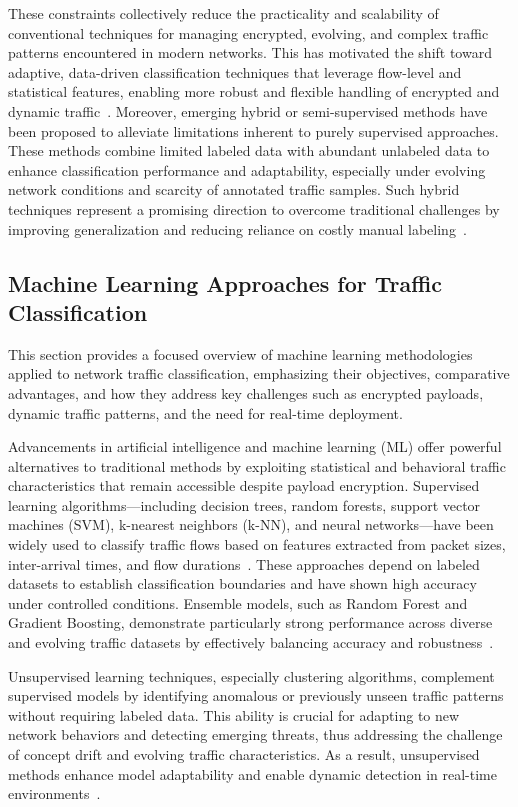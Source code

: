 \documentclass[sigconf]{acmart}
\begin{document}
These constraints collectively reduce the practicality and scalability of conventional techniques for managing encrypted, evolving, and complex traffic patterns encountered in modern networks. This has motivated the shift toward adaptive, data-driven classification techniques that leverage flow-level and statistical features, enabling more robust and flexible handling of encrypted and dynamic traffic~\cite{ref51}. Moreover, emerging hybrid or semi-supervised methods have been proposed to alleviate limitations inherent to purely supervised approaches. These methods combine limited labeled data with abundant unlabeled data to enhance classification performance and adaptability, especially under evolving network conditions and scarcity of annotated traffic samples. Such hybrid techniques represent a promising direction to overcome traditional challenges by improving generalization and reducing reliance on costly manual labeling~\cite{ref51}.

\subsection{Machine Learning Approaches for Traffic Classification}

This section provides a focused overview of machine learning methodologies applied to network traffic classification, emphasizing their objectives, comparative advantages, and how they address key challenges such as encrypted payloads, dynamic traffic patterns, and the need for real-time deployment.

Advancements in artificial intelligence and machine learning (ML) offer powerful alternatives to traditional methods by exploiting statistical and behavioral traffic characteristics that remain accessible despite payload encryption. Supervised learning algorithms—including decision trees, random forests, support vector machines (SVM), k-nearest neighbors (k-NN), and neural networks—have been widely used to classify traffic flows based on features extracted from packet sizes, inter-arrival times, and flow durations~\cite{ref51}. These approaches depend on labeled datasets to establish classification boundaries and have shown high accuracy under controlled conditions. Ensemble models, such as Random Forest and Gradient Boosting, demonstrate particularly strong performance across diverse and evolving traffic datasets by effectively balancing accuracy and robustness~\cite{ref51}.

Unsupervised learning techniques, especially clustering algorithms, complement supervised models by identifying anomalous or previously unseen traffic patterns without requiring labeled data. This ability is crucial for adapting to new network behaviors and detecting emerging threats, thus addressing the challenge of concept drift and evolving traffic characteristics. As a result, unsupervised methods enhance model adaptability and enable dynamic detection in real-time environments~\cite{ref51}.
\end{document}
